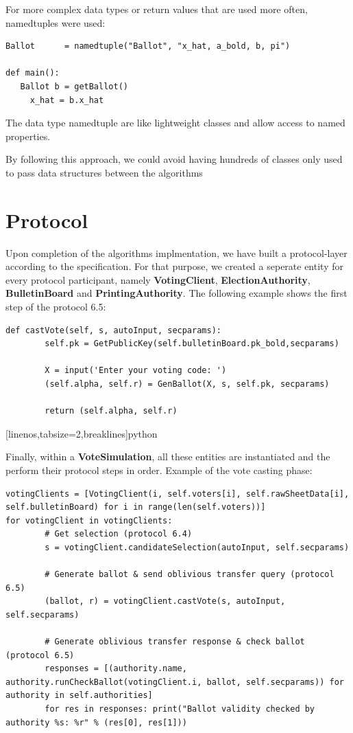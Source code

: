\documentclass[a4paper,12pt]{report}
\begin{document}
For more complex data types or return values that are used more often, namedtuples were used:

\begin{verbatim}
Ballot      = namedtuple("Ballot", "x_hat, a_bold, b, pi")

def main():
   Ballot b = getBallot()
	 x_hat = b.x_hat
\end{verbatim}

The data type namedtuple are like lightweight classes and allow access to named properties.

By following this approach, we could avoid having hundreds of classes only used to pass data structures between the algorithms

\section{Protocol}
Upon completion of the algorithms implmentation, we have built a protocol-layer according to the specification. For that purpose, we created a seperate entity for every protocol participant, namely \textbf{VotingClient}, \textbf{ElectionAuthority}, \textbf{BulletinBoard} and \textbf{PrintingAuthority}. The following example shows the first step of the protocol 6.5:

\begin{verbatim}
def castVote(self, s, autoInput, secparams):
		self.pk = GetPublicKey(self.bulletinBoard.pk_bold,secparams)

		X = input('Enter your voting code: ')
		(self.alpha, self.r) = GenBallot(X, s, self.pk, secparams)

		return (self.alpha, self.r)
\end{verbatim}[linenos,tabsize=2,breaklines]{python}

Finally, within a \textbf{VoteSimulation}, all these entities are instantiated and the perform their protocol steps in order. Example of the vote casting phase:

\begin{verbatim}
votingClients = [VotingClient(i, self.voters[i], self.rawSheetData[i], self.bulletinBoard) for i in range(len(self.voters))]
for votingClient in votingClients:
		# Get selection (protocol 6.4)
		s = votingClient.candidateSelection(autoInput, self.secparams)

		# Generate ballot & send oblivious transfer query (protocol 6.5)
		(ballot, r) = votingClient.castVote(s, autoInput, self.secparams)

		# Generate oblivious transfer response & check ballot (protocol 6.5)
		responses = [(authority.name, authority.runCheckBallot(votingClient.i, ballot, self.secparams)) for authority in self.authorities]
		for res in responses: print("Ballot validity checked by authority %s: %r" % (res[0], res[1]))
\end{verbatim}
\end{document}
